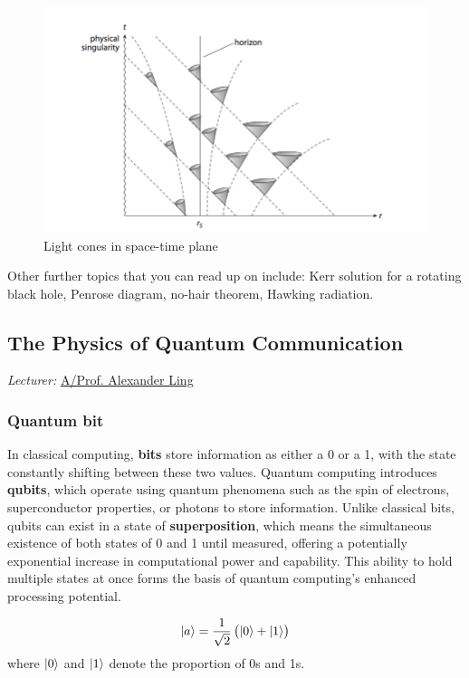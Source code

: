 \documentclass[12pt,a4paper]{article}
\begin{document}
\begin{figure}[H]
    \centering
    \includegraphics[width=17cm]{images/oppenheimer_snyder.png}
    \caption{Light cones in space-time plane}
    \label{fig:oppenheimer_snyder}
\end{figure}

Other further topics that you can read up on include: Kerr solution for a rotating black hole, Penrose diagram, no-hair theorem, Hawking radiation.
\pagebreak

\subsection{The Physics of Quantum Communication}
{\color{red}\textit{Lecturer:}} \href{https://www.physics.nus.edu.sg/faculty/ling-euk-jin-alexander/}{A/Prof. Alexander Ling}

\subsubsection{Quantum bit}
In classical computing, \textbf{bits} store information as either a 0 or a 1, with the state constantly shifting between these two values. Quantum computing introduces \textbf{qubits}, which operate using quantum phenomena such as the spin of electrons, superconductor properties, or photons to store information. Unlike classical bits, qubits can exist in a state of \textbf{superposition}, which means the simultaneous existence of both states of 0 and 1 until measured, offering a potentially exponential increase in computational power and capability. This ability to hold multiple states at once forms the basis of quantum computing's enhanced processing potential.

\begin{equation}\label{quantum_bit}
\ket{a} = \frac{1}{\sqrt{2}}\left(\ket{0}+\ket{1}\right)
\end{equation}
where $\ket{0}$ and $\ket{1}$ denote the proportion of 0s and 1s.
\end{document}
